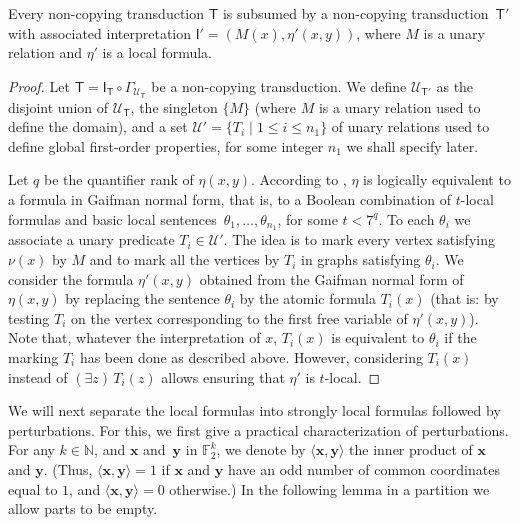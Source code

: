 \documentclass{lmcs}
\newcommand{\N}{\mathbb{N}}
\theoremstyle{definition}
\begin{document}
\begin{lem}
	\label{lem:normal0}
	Every non-copying transduction $\mathsf T$ is subsumed by a non-copying transduction~$\mathsf T'$ with associated interpretation $\mathsf I'=(M(x),\eta'(x,y))$, where $M$ is a unary relation and $\eta'$ is a local formula.
\end{lem}
\begin{proof}
	Let $\mathsf T=\mathsf I_{\mathsf T}\circ\Gamma_{{\mathcal U}_{\mathsf T}}$ be a non-copying transduction.
	We define ${\mathcal U}_{\mathsf T'}$ as the disjoint union of ${\mathcal U}_{\mathsf T}$, the singleton $\{M\}$ (where $M$ is a unary relation used to define the domain), and  a set ${\mathcal U}'=\{T_i\mid 1\leq i\leq n_1\}$ of unary relations used to define global first-order properties, for some integer $n_1$ we shall specify later. 
	
	
	Let $q$ be the quantifier rank of $\eta(x,y)$.  According to
	, $\eta$ is logically equivalent to a formula in 
	Gaifman normal form, that is, to a Boolean
	combination of $t$-local formulas and
	basic local sentences~$\theta_1,\dots,\theta_{n_1}$, for some $t<7^q$.  To each
	$\theta_i$ we associate a unary predicate $T_i\in {\mathcal U}'$. 
	The idea is to mark every vertex satisfying $\nu(x)$ by $M$  and to mark all the vertices
	by $T_i$ in graphs satisfying $\theta_i$. 
	We consider the
	formula ${\eta}'(x,y)$ obtained from the Gaifman normal form of $\eta(x,y)$ 
	by replacing the sentence $\theta_i$ by the atomic formula $T_i(x)$ (that is: by testing $T_i$ on the vertex corresponding to the first free variable of ${\eta}'(x,y)$).
	Note that, whatever the interpretation of $x$, $T_i(x)$ is equivalent to $\theta_i$ if the marking $T_i$ has been done as described above. However,  considering $T_i(x)$ instead of $(\exists z)\, T_i(z)$ allows  
	ensuring that ${\eta}'$ is $t$-local. 
\end{proof}

We will next separate the local formulas into strongly local formulas followed by perturbations. For this, we first give a practical characterization of perturbations.
For any $k\in \N$, and $\mathbf x$ and~$\mathbf y$ in $\mathbb{F}_2^k$, we denote by  $\langle\mathbf x,\mathbf y\rangle$ the inner product of  $\mathbf x$ and $\mathbf y$.
(Thus, $\langle\mathbf x,\mathbf y\rangle=1$  if $\mathbf x$ and $\mathbf y$ have an odd number of common coordinates equal to $1$, and $\langle\mathbf x,\mathbf y\rangle=0$ otherwise.) In the following lemma in a partition we allow parts to be empty.
\end{document}
